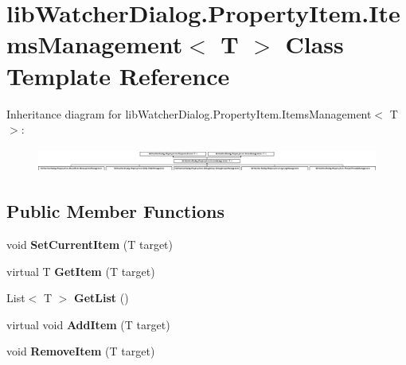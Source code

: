 \hypertarget{classlib_watcher_dialog_1_1_property_item_1_1_items_management_3_01_t_01_4}{\section{lib\+Watcher\+Dialog.\+Property\+Item.\+Items\+Management$<$ T $>$ Class Template Reference}
\label{classlib_watcher_dialog_1_1_property_item_1_1_items_management_3_01_t_01_4}
}
Inheritance diagram for lib\+Watcher\+Dialog.\+Property\+Item.\+Items\+Management$<$ T $>$\+:\begin{figure}[H]
\begin{center}
\leavevmode
\includegraphics[height=0.805755cm]{classlib_watcher_dialog_1_1_property_item_1_1_items_management_3_01_t_01_4}
\end{center}
\end{figure}
\subsection*{Public Member Functions}
\begin{DoxyCompactItemize}
\item 
\hypertarget{classlib_watcher_dialog_1_1_property_item_1_1_items_management_3_01_t_01_4_a294567631a71ecc04b9c979ba4957fb5}{void {\bfseries Set\+Current\+Item} (T target)}\label{classlib_watcher_dialog_1_1_property_item_1_1_items_management_3_01_t_01_4_a294567631a71ecc04b9c979ba4957fb5}

\item 
\hypertarget{classlib_watcher_dialog_1_1_property_item_1_1_items_management_3_01_t_01_4_ad74f5de22ed0cfeb37db979122dc4b29}{virtual T {\bfseries Get\+Item} (T target)}\label{classlib_watcher_dialog_1_1_property_item_1_1_items_management_3_01_t_01_4_ad74f5de22ed0cfeb37db979122dc4b29}

\item 
\hypertarget{classlib_watcher_dialog_1_1_property_item_1_1_items_management_3_01_t_01_4_aa4f9e34b66bd4653c4e5186072ff75e1}{List$<$ T $>$ {\bfseries Get\+List} ()}\label{classlib_watcher_dialog_1_1_property_item_1_1_items_management_3_01_t_01_4_aa4f9e34b66bd4653c4e5186072ff75e1}

\item 
\hypertarget{classlib_watcher_dialog_1_1_property_item_1_1_items_management_3_01_t_01_4_aa5689376bc872450750f35001a96ddd7}{virtual void {\bfseries Add\+Item} (T target)}\label{classlib_watcher_dialog_1_1_property_item_1_1_items_management_3_01_t_01_4_aa5689376bc872450750f35001a96ddd7}

\item 
\hypertarget{classlib_watcher_dialog_1_1_property_item_1_1_items_management_3_01_t_01_4_af49b8f6074d2e641e3a568ee67f53a24}{void {\bfseries Remove\+Item} (T target)}\label{classlib_watcher_dialog_1_1_property_item_1_1_items_management_3_01_t_01_4_af49b8f6074d2e641e3a568ee67f53a24}

\end{DoxyCompactItemize}
